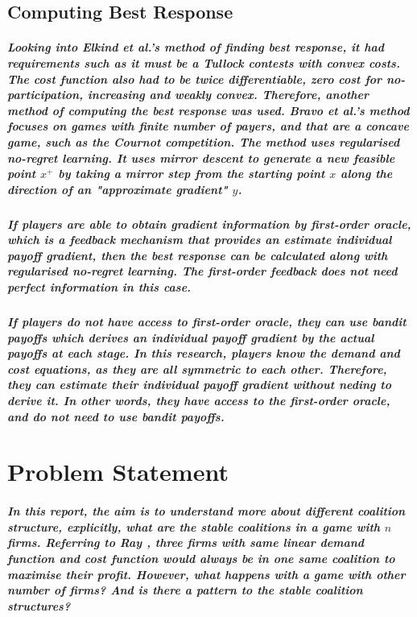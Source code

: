 \documentclass[11pt]{report}
\begin{document}
\section{Computing Best Response}
\paragraph{Looking into Elkind et al.'s \cite{elkind2021bestresponse} method of finding best response, it had requirements such as it must be a Tullock contests with convex costs. The cost function also had to be twice differentiable, zero cost for no-participation, increasing and weakly convex. Therefore, another method of computing the best response was used. Bravo et al.'s \cite{bravo2018bandit} method focuses on games with finite number of payers, and that are a concave game, such as the Cournot competition. The method uses regularised no-regret learning. It uses mirror descent to generate a new feasible point $x^+$ by taking a mirror step from the starting point $x$ along the direction of an "approximate gradient" $y$.}
\paragraph{If players are able to obtain gradient information by first-order oracle, which is a feedback mechanism that provides an estimate individual payoff gradient, then the best response can be calculated along with regularised no-regret learning. The first-order feedback does not need perfect information in this case. }

\paragraph{If players do not have access to first-order oracle, they can use bandit payoffs which derives an individual payoff gradient by the actual payoffs at each stage. In this research, players know the demand and cost equations, as they are all symmetric to each other. Therefore, they can estimate their individual payoff gradient without neding to derive it. In other words, they have access to the first-order oracle, and do not need to use bandit payoffs. }
\chapter{Problem Statement}
\paragraph{In this report, the aim is to understand more about different coalition structure, explicitly, what are the stable coalitions in a game with $n$ firms. Referring to Ray \cite[Chapter 2]{ray2007ch2}, three firms with same linear demand function and cost function would always be in one same coalition to maximise their profit. However, what happens with a game with other number of firms? And is there a pattern to the stable coalition structures?}
\end{document}
